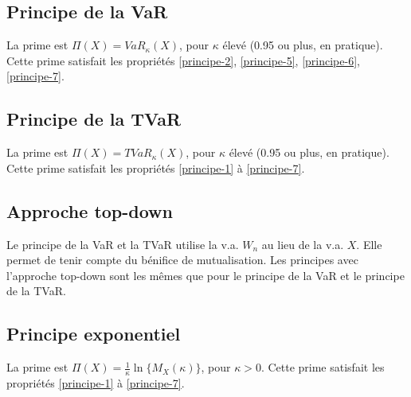 \subsection{Principe de la VaR}
La prime est $\Pi(X) = VaR_\kappa(X)$, pour $\kappa$ élevé (0.95 ou plus, en pratique). Cette prime satisfait les propriétés \ref{principe-2}, \ref{principe-5}, \ref{principe-6}, \ref{principe-7}.

\subsection{Principe de la TVaR}
La prime est $\Pi(X) = TVaR_\kappa(X)$, pour $\kappa$ élevé (0.95 ou plus, en pratique). Cette prime satisfait les propriétés \ref{principe-1} à \ref{principe-7}.

\subsection{Approche top-down}

Le principe de la VaR et la TVaR utilise la v.a. $W_n$ au lieu de la v.a. $X$. Elle permet de tenir compte du bénifice de mutualisation. Les principes avec l'approche top-down sont les mêmes que pour le principe de la VaR et le principe de la TVaR. 

\subsection{Principe exponentiel}
La prime est $\Pi(X) = \frac{1}{\kappa}\ln\{M_X(\kappa)\}$, pour $\kappa > 0$. Cette prime satisfait les propriétés \ref{principe-1} à \ref{principe-7}.

